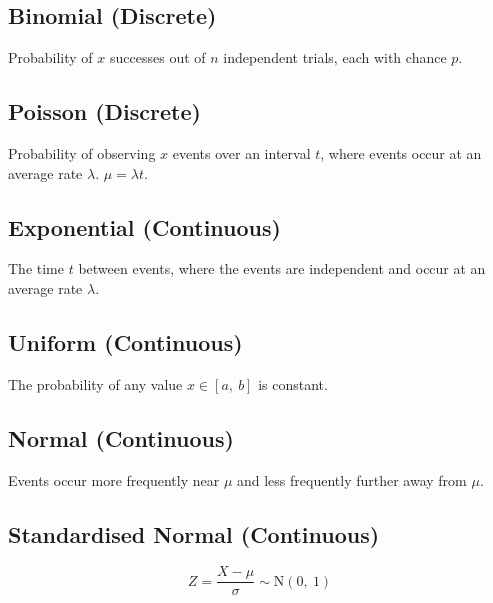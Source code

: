 \documentclass{article}
\begin{document}
\begin{minipage}{62.39259259mm}
    \subsection*{Binomial (Discrete)}
    Probability of $x$ successes out of $n$ independent trials, each with chance $p$.
    \subsection*{Poisson (Discrete)}
    Probability of observing $x$ events over an interval $t$, where events occur at an
    average rate $\lambda$. $\mu = \lambda t$.
    \subsection*{Exponential (Continuous)}
    The time $t$ between events, where the events are independent and occur at an average rate $\lambda$.
    \subsection*{Uniform (Continuous)}
    The probability of any value $x\in\left[ a,\: b \right]$ is constant.
    \subsection*{Normal (Continuous)}
    Events occur more frequently near $\mu$ and less frequently further away from $\mu$.
    \subsection*{Standardised Normal (Continuous)}
    \begin{equation*}
        Z = \frac{X-\mu}{\sigma} \sim \mathrm{N}\left( 0,\: 1 \right)
    \end{equation*}
\end{minipage}
\end{document}

